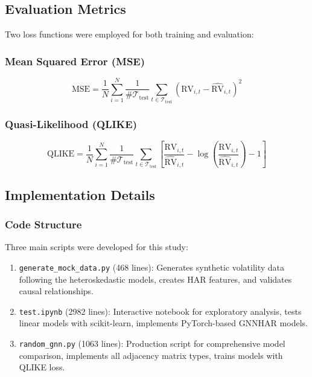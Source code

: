 \documentclass[10pt,a4paper]{article}
\newcommand{\RV}{\text{RV}}
\begin{document}
\subsection{Evaluation Metrics}

Two loss functions were employed for both training and evaluation:

\subsubsection{Mean Squared Error (MSE)}

\begin{equation}
\text{MSE} = \frac{1}{N} \sum_{i=1}^N \frac{1}{\#\mathcal{T}_{\text{test}}} \sum_{t \in \mathcal{T}_{\text{test}}} (\RV_{i,t} - \widehat{\RV}_{i,t})^2
\end{equation}

\subsubsection{Quasi-Likelihood (QLIKE)}

\begin{equation}
\text{QLIKE} = \frac{1}{N} \sum_{i=1}^N \frac{1}{\#\mathcal{T}_{\text{test}}} \sum_{t \in \mathcal{T}_{\text{test}}} \left[ \frac{\RV_{i,t}}{\widehat{\RV}_{i,t}} - \log\left(\frac{\RV_{i,t}}{\widehat{\RV}_{i,t}}\right) - 1 \right]
\end{equation}

\subsection{Implementation Details}

\subsubsection{Code Structure}

Three main scripts were developed for this study:

\begin{enumerate}
\item \texttt{generate\_mock\_data.py} (468 lines): Generates synthetic volatility data following the heteroskedastic models, creates HAR features, and validates causal relationships.

\item \texttt{test.ipynb} (2982 lines): Interactive notebook for exploratory analysis, tests linear models with scikit-learn, implements PyTorch-based GNNHAR models.

\item \texttt{random\_gnn.py} (1063 lines): Production script for comprehensive model comparison, implements all adjacency matrix types, trains models with QLIKE loss.
\end{enumerate}
\end{document}
